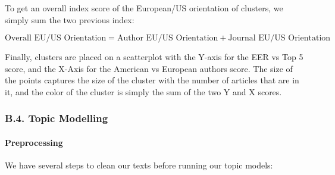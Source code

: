 \documentclass[]{elsarticle} %
\begin{document}
To get an overall index score of the European/US orientation of
clusters, we simply sum the two previous index:

\(\text{Overall EU/US Orientation}=\text{Author EU/US Orientation} + \text{Journal EU/US Orientation}\)

Finally, clusters are placed on a scatterplot with the Y-axis for the
EER vs Top 5 score, and the X-Axis for the American vs European authors
score. The size of the points captures the size of the cluster with the
number of articles that are in it, and the color of the cluster is
simply the sum of the two Y and X scores.

\hypertarget{topic}{%
\subsubsection*{B.4. Topic Modelling}\label{topic}}

\hypertarget{preprocessing}{%
\paragraph*{Preprocessing}\label{preprocessing}}

We have several steps to clean our texts before running our topic
models:
\end{document}
